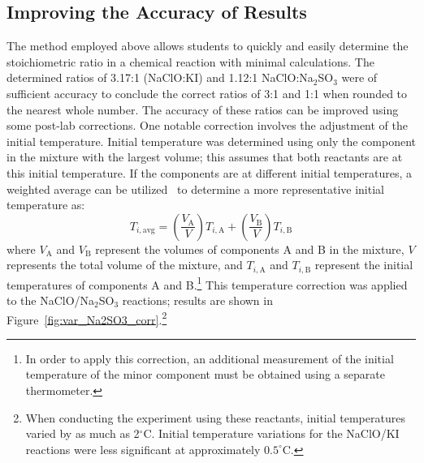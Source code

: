 \subsection{Improving the Accuracy of Results}
The method employed above allows students to quickly and easily determine the stoichiometric ratio in a chemical reaction with minimal calculations.  
The determined ratios of 3.17:1 (NaClO:KI) and 1.12:1 NaClO:Na$_2$SO$_3$ were of sufficient accuracy to conclude the correct ratios of 3:1 and 1:1 when 
rounded to the nearest whole number.  The accuracy of these ratios can be improved using some post-lab corrections.  One notable correction involves the 
adjustment of the initial temperature.  Initial temperature was determined using only the component in the mixture with the largest volume; this 
assumes that both reactants are at this initial temperature.  If the components are at different initial temperatures, a weighted average can be 
utilized~\cite{vonderbrink} to determine a more representative initial temperature as:
\begin{displaymath}
T_{i,\mathrm{avg}} = \left(\frac{V_\mathrm{A}}{V}\right)T_{i,\mathrm{A}} + \left(\frac{V_\mathrm{B}}{V}\right)T_{i,\mathrm{B}}
\end{displaymath}
where $V_\mathrm{A}$ and $V_\mathrm{B}$ represent the volumes of components A and B in the mixture, $V$ represents the total volume of the mixture, 
and $T_{i,\mathrm{A}}$ and $T_{i,\mathrm{B}}$ represent the initial temperatures of components A and B.\footnote{In order to apply this correction, 
an additional measurement of the initial temperature of the minor component must be obtained using a separate thermometer.}  This temperature 
correction was applied to the NaClO/Na$_2$SO$_3$ reactions; results are shown in Figure~\ref{fig:var_Na2SO3_corr}.\footnote{When conducting the 
experiment using these reactants, initial temperatures varied by as much as 2$^\circ$C.  Initial temperature variations for the NaClO/KI reactions 
were less significant at approximately $0.5^\circ$C.} 


